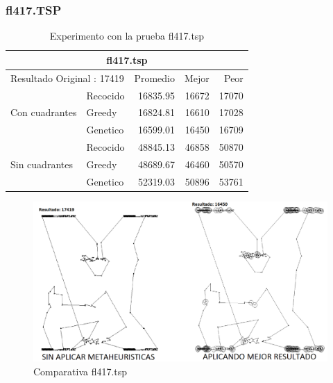 \subsubsection{fl417.TSP}
\begin{table}[hbtp]
 \centering 
	\begin{tabular}{ | l   l | r | r | r |   }
       \hline\multicolumn{5}{|c|}{ \rowcolor[gray]{0.8} fl417.tsp} \\\hline
        \multicolumn{2}{|l|}{Resultado Original : 17419} & Promedio & Mejor & Peor \\ \hline
                        & Recocido  & 16835.95 & 16672 & 17070  \\ 
         Con cuadrantes & Greedy    & 16824.81 & 16610 & 17028  \\ 
                        & Genetico  & 16599.01 & 16450 & 16709  \\ \hline
                        & Recocido  & 48845.13 & 46858 & 50870   \\ 
         Sin cuadrantes & Greedy    & 48689.67 & 46460 & 50570   \\ 
                        & Genetico  & 52319.03 & 50896 & 53761    \\ \hline
    \end{tabular}
    \caption{Experimento con la prueba fl417.tsp}
    \label{table:EXP_fl417.tsp}
\end{table}
\begin{figure}[hbtp]
    \centering
        \includegraphics[width=1\textwidth]{PruebasResultados/Experimentos_Comparativas/fl417.png}
        \caption{Comparativa fl417.tsp}
        \label{fig:fl417_comparativa.png}
\end{figure}
